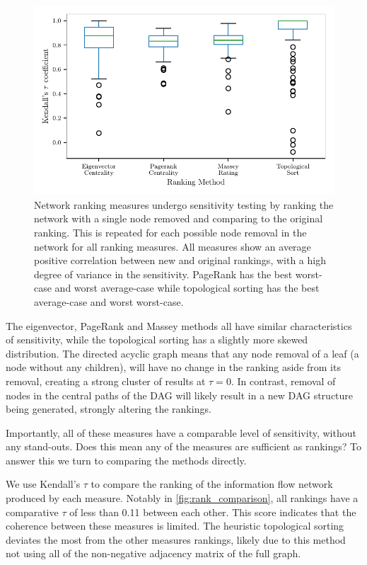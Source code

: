 \begin{figure}[!htbp]
\centering
\includegraphics{chapter4/figs/removal_ranking_boxplot.pdf}
\caption{Network ranking measures undergo sensitivity testing by ranking the network with a single node removed and comparing to the original ranking. This is repeated for each possible node removal in the network for all ranking measures. All measures show an average positive correlation between new and original rankings, with a high degree of variance in the sensitivity. PageRank has the best worst-case and worst average-case while topological sorting has the best average-case and worst worst-case.}\label{fig:rank_boxplots}
\end{figure}

The eigenvector, PageRank and Massey methods all have similar characteristics of sensitivity, while the topological sorting has a slightly more skewed distribution. The directed acyclic graph means that any node removal of a leaf (a node without any children), will have no change in the ranking aside from its removal, creating a strong cluster of results at $\tau=0$. In contrast, removal of nodes in the central paths of the DAG will likely result in a new DAG structure being generated, strongly altering the rankings.

Importantly, all of these measures have a comparable level of sensitivity, without any stand-outs. Does this mean any of the measures are sufficient as rankings? To answer this we turn to comparing the methods directly.

We use Kendall's $\tau$ to compare the ranking of the information flow network produced by each measure. Notably in \autoref{fig:rank_comparison}, all rankings have a comparative $\tau$ of less than 0.11 between each other. This score indicates that the coherence between these measures is limited. The heuristic topological sorting deviates the most from the other measures rankings, likely due to this method not using all of the non-negative adjacency matrix of the full graph.

